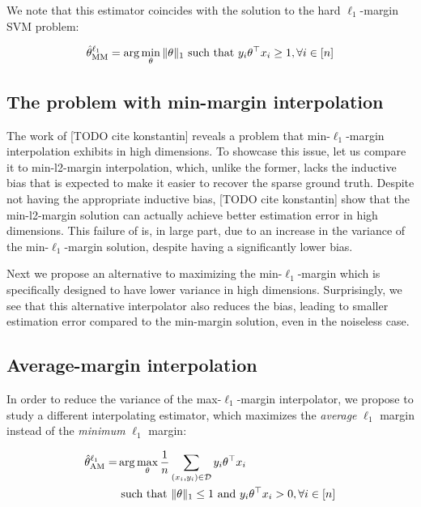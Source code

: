 We note that this estimator coincides with the solution to the hard
$\ell_1$-margin SVM problem:

\begin{align}
  \hat{\theta}^{\ell_1}_{\mathrm{MM}} = \arg\min_{\theta} \|\theta\|_1 \text{ such that } y_i\theta^\top x_i \ge 1, \forall i \in
  [n]
\end{align}

\subsection{The problem with min-margin interpolation}

The work of [TODO cite konstantin] reveals a problem that min-$\ell_1$-margin
interpolation exhibits in high dimensions.  To showcase this issue, let us
compare it to min-l2-margin interpolation, which, unlike the former, lacks the
inductive bias that is expected to make it easier to recover the sparse ground
truth. Despite not having the appropriate inductive bias, [TODO cite konstantin]
show that the min-l2-margin solution can actually achieve better estimation
error in high dimensions. 
This failure of is, in large part, due to an increase in the variance of the
min-$\ell_1$-margin solution, despite having a significantly lower bias.

Next we propose an alternative to maximizing the min-$\ell_1$-margin which is
specifically designed to have lower variance in high dimensions.  Surprisingly,
we see that this alternative interpolator also reduces the bias, leading to
smaller estimation error compared to the min-margin solution, even in the
noiseless case.

\subsection{Average-margin interpolation}

In order to reduce the variance of the max-$\ell_1$-margin interpolator, we
propose to study a different interpolating estimator, which maximizes the
\emph{average} $\ell_1$ margin instead of the \emph{minimum} $\ell_1$ margin:

\begin{align}
  \hat{\theta}^{\ell_1}_{\mathrm{AM}} =& \arg\max_{\theta} \frac{1}{n} \sum_{(x_i, y_i) \in \mathcal{D}} y_i\theta^\top x_i \\
  &\text{ such that }
  \|\theta\|_1 \le 1 \text{ and } y_i\theta^\top x_i > 0, \forall i \in [n]
\end{align}

